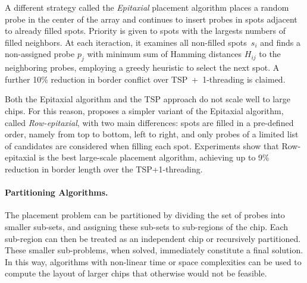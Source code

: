 \documentclass{llncs}
\newcommand{\ignore}[1]{}
\begin{document}
A different strategy called the \emph{Epitaxial} placement algorithm
\cite{KAHNG02} places a random probe in the center of the array and continues
to insert probes in spots adjacent to already filled spots. Priority is given
to spots with the largests numbers of filled neighbors. At each iteraction, it
examines all non-filled spots~$s_i$ and finds a non-assigned probe $p_j$ with
minimum sum of Hamming distances $H_{ij}$ to the neighboring probes, employing
a greedy heuristic to select the next spot.  A further 10\% reduction in
border conflict over TSP~+~1-threading is claimed.

\ignore{
The major problem with the Epitaxial and the TSP-based algorithm is that they
have at least quadratic time complexity and thus are not scalable for the
latest million-probe microarrays. According to their experiments, the TSP
approach needed around 32 minutes to produce the layout of a 200\,x\,200
chip, whereas the Epitaxial algorithm needed 74 minutes on average. For a
500\,x\,500 chip, the TSP took over 30 hours to complete, whereas the
Epitaxial algorithm did not complete ``due to prohibitively large running
time or memory requirements'' \cite{KAHNG02}.
}

\ignore{
This observation has led to the development of two new algorithms by
\cite{KAHNG03A}. The first one, called Sliding-window Matching (SWM), is not
exactly a placement algorithm as it iteratively improves an initial placement
that can be constructed by, for instance, TSP and 1-threading. Improvements
are achieved by selecting an independent set of spots inside the window and
optimally replacing their probes using a minimum-weight perfect matching
algorithm. The term independent refers to probes that can be replaced without
affecting the border length of the other selected probes.
}

Both the Epitaxial algorithm and the TSP approach do not scale well to large
chips. For this reason, \cite{KAHNG03A} proposes a simpler variant of the
Epitaxial algorithm, called \emph{Row-epitaxial}, with two main differences:
spots are filled in a pre-defined order, namely from top to bottom, left to
right, and only probes of a limited list of candidates are considered when
filling each spot. Experiments show that Row-epitaxial is the best
large-scale placement algorithm, achieving up to 9\% reduction in border
length over the TSP+1-threading.


\paragraph{Partitioning Algorithms.}
The placement problem can be partitioned by dividing the set of probes into
smaller sub-sets, and assigning these sub-sets to sub-regions of the chip.
Each sub-region can then be treated as an independent chip or recursively
partitioned. These smaller sub-problems, when solved, immediately constitute a
final solution. In this way, algorithms with non-linear time or space
complexities can be used to compute the layout of larger chips that otherwise
would not be feasible.
\end{document}
